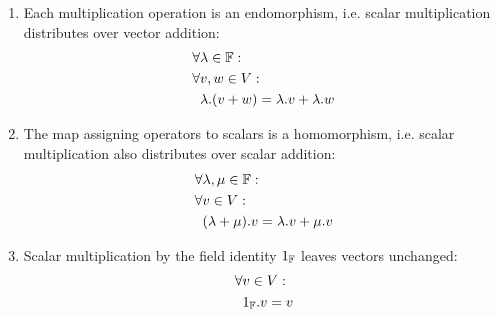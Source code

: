 \begin{enumerate}
	\item Each multiplication operation is an endomorphism, i.e. scalar multiplication distributes over vector addition:
	\begin{align*}
		\forall &\lambda \in \mathbb{F}:\\
		\forall &v,w \in V:\\
		&\lambda.(v+w) = \lambda.v + \lambda.w
	\end{align*}
	\item The map assigning operators to scalars is a homomorphism, i.e. scalar multiplication also distributes over scalar addition:
	\begin{align*}
		\forall &\lambda, \mu \in \mathbb{F}:\\
		\forall &v \in V:\\
		&(\lambda + \mu).v = \lambda.v + \mu.v
	\end{align*}
	\item Scalar multiplication by the field identity $1_{\mathbb{F}}$ leaves vectors unchanged:
	\begin{align*}
		\forall &v \in V:\\
		&1_{\mathbb{F}}.v = v
	\end{align*}
\end{enumerate}

